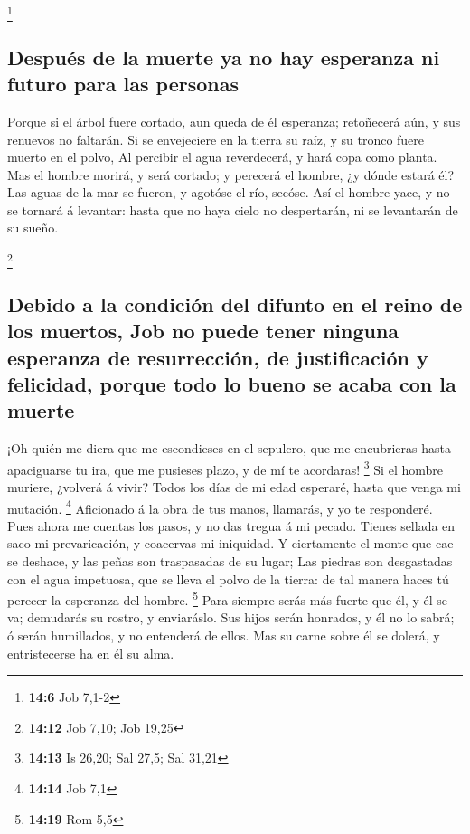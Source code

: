 \footnote{\textbf{14:6} Job 7,1-2}

\hypertarget{despuuxe9s-de-la-muerte-ya-no-hay-esperanza-ni-futuro-para-las-personas}{%
\subsection{Después de la muerte ya no hay esperanza ni futuro para las
personas}\label{despuuxe9s-de-la-muerte-ya-no-hay-esperanza-ni-futuro-para-las-personas}}

 Porque si el árbol fuere cortado, aun queda de él
esperanza; retoñecerá aún, y sus renuevos no faltarán.  Si
se envejeciere en la tierra su raíz, y su tronco fuere muerto en el
polvo,  Al percibir el agua reverdecerá, y hará copa como
planta.  Mas el hombre morirá, y será cortado; y perecerá
el hombre, ¿y dónde estará él?  Las aguas de la mar se
fueron, y agotóse el río, secóse.  Así el hombre yace, y no
se tornará á levantar: hasta que no haya cielo no despertarán, ni se
levantarán de su sueño.

\footnote{\textbf{14:12} Job 7,10; Job 19,25}

\hypertarget{debido-a-la-condiciuxf3n-del-difunto-en-el-reino-de-los-muertos-job-no-puede-tener-ninguna-esperanza-de-resurrecciuxf3n-de-justificaciuxf3n-y-felicidad-porque-todo-lo-bueno-se-acaba-con-la-muerte}{%
\subsection{Debido a la condición del difunto en el reino de los
muertos, Job no puede tener ninguna esperanza de resurrección, de
justificación y felicidad, porque todo lo bueno se acaba con la
muerte}\label{debido-a-la-condiciuxf3n-del-difunto-en-el-reino-de-los-muertos-job-no-puede-tener-ninguna-esperanza-de-resurrecciuxf3n-de-justificaciuxf3n-y-felicidad-porque-todo-lo-bueno-se-acaba-con-la-muerte}}

 ¡Oh quién me diera que me escondieses en el sepulcro, que
me encubrieras hasta apaciguarse tu ira, que me pusieses plazo, y de mí
te acordaras! \footnote{\textbf{14:13} Is 26,20; Sal 27,5; Sal 31,21}
 Si el hombre muriere, ¿volverá á vivir? Todos los días de
mi edad esperaré, hasta que venga mi mutación. \footnote{\textbf{14:14}
  Job 7,1}  Aficionado á la obra de tus manos, llamarás, y
yo te responderé.  Pues ahora me cuentas los pasos, y no
das tregua á mi pecado.  Tienes sellada en saco mi
prevaricación, y coacervas mi iniquidad.  Y ciertamente el
monte que cae se deshace, y las peñas son traspasadas de su lugar;
 Las piedras son desgastadas con el agua impetuosa, que se
lleva el polvo de la tierra: de tal manera haces tú perecer la esperanza
del hombre. \footnote{\textbf{14:19} Rom 5,5}  Para siempre
serás más fuerte que él, y él se va; demudarás su rostro, y enviaráslo.
 Sus hijos serán honrados, y él no lo sabrá; ó serán
humillados, y no entenderá de ellos.  Mas su carne sobre él
se dolerá, y entristecerse ha en él su alma.

